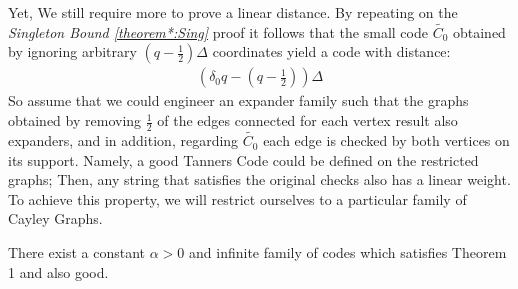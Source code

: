Yet, We still require more to prove a linear distance. 
By repeating on the \emph{Singleton Bound \ref{theorem*:Sing} } proof it follows that the small code $\tilde{C_{0}}$ obtained by ignoring arbitrary $ \left( q - \frac{1}{2} \right) \Delta $ coordinates yield a code with distance: 
\begin{equation*}
  \begin{split}
    \left( \delta_{0}q - \left( q - \frac{1}{2} \right) \right)\Delta
  \end{split}
\end{equation*}
So assume that we could engineer an expander family such that the graphs obtained by removing $\frac{1}{2}$ of the edges connected for each vertex result also expanders, and in addition, regarding $\tilde{C_{0}}$ each edge is checked by both vertices on its support. Namely, a good Tanners Code could be defined on the restricted graphs; Then, any string that satisfies the original checks also has a linear weight. To achieve this property, we will restrict ourselves to a particular family of Cayley Graphs.  

\begin{theorem*}[Theorem 1+] There exist a constant $\alpha > 0 $ and infinite family of codes which satisfies Theorem 1 and also good.
\end{theorem*}


